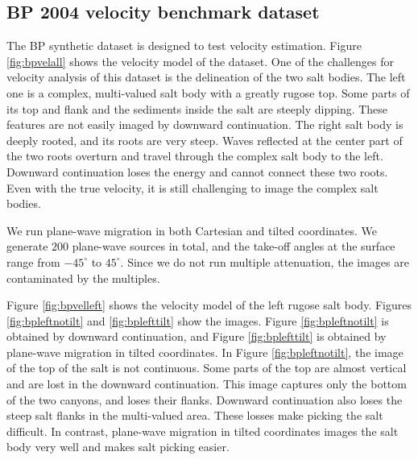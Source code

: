 \subsection{BP 2004 velocity benchmark dataset}
The BP synthetic dataset is designed to test velocity estimation. Figure \ref{fig:bpvelall} shows the velocity model of the dataset. 
One of the challenges for velocity analysis of this dataset is the delineation of the two salt bodies. 
The left one is a complex, multi-valued salt body with a greatly rugose top. 
Some parts of its top and flank and the sediments inside the salt are steeply dipping. 
These features are not easily imaged by downward continuation. The right salt body is deeply rooted, and  
its roots are very steep. Waves reflected at the center part of the two roots overturn and travel through 
the complex salt body to the left. Downward continuation loses the energy and cannot connect these two roots. 
Even with the true velocity, it is still challenging to image the complex salt bodies.


We run plane-wave migration in both Cartesian and tilted coordinates. We generate $200$ plane-wave sources in total,
and the take-off angles at the surface range from $-45^\circ$ to $45^\circ$. Since we do not run multiple
attenuation, the images are contaminated by the multiples.

\par
Figure \ref{fig:bpvelleft} shows the velocity model of the left rugose salt body.
Figures \ref{fig:bpleftnotilt} and \ref{fig:bplefttilt} show the images. 
Figure \ref{fig:bpleftnotilt} is obtained by downward continuation, 
and Figure \ref{fig:bplefttilt} is obtained by plane-wave migration in tilted coordinates. 
In Figure \ref{fig:bpleftnotilt}, the image of the 
top of the salt is not continuous. Some parts of the top are almost vertical and are lost in the downward 
continuation. This image captures only the bottom of the two canyons, and loses their flanks. 
Downward continuation also loses the steep salt flanks in the multi-valued area. These losses make picking 
the salt difficult. In contrast, plane-wave migration in tilted coordinates images the salt body 
very well and makes salt picking easier.


